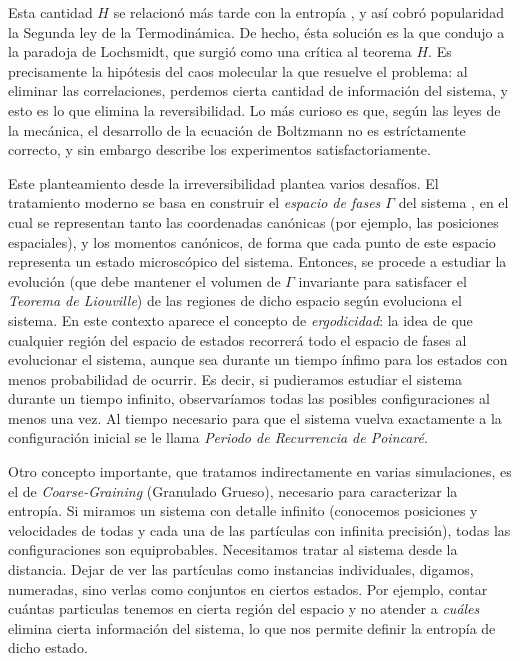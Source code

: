 \documentclass[11pt, a4paper]{article} %
\theoremstyle{named}
\begin{document}
Esta cantidad $H$ se relacionó más tarde con la entropía \cite{huang}, y así cobró popularidad la Segunda ley de la Termodinámica. De hecho, ésta solución es la que condujo a la paradoja de Lochsmidt, que surgió como una crítica al teorema $H$. Es precisamente la hipótesis del caos molecular la que resuelve el problema: al eliminar las correlaciones, perdemos cierta cantidad de información del sistema, y esto es lo que elimina la reversibilidad.
Lo más curioso es que, según las leyes de la mecánica, el desarrollo de la ecuación de Boltzmann no es estríctamente correcto, y sin embargo describe los experimentos satisfactoriamente.

Este planteamiento desde la irreversibilidad plantea varios desafíos. El tratamiento moderno se basa en construir el \textit{espacio de fases $\Gamma$} del sistema \cite{pathria}, en el cual se representan tanto las coordenadas canónicas (por ejemplo, las posiciones espaciales), y los momentos canónicos, de forma que cada punto de este espacio representa un estado microscópico del sistema. Entonces, se procede a estudiar la evolución (que debe mantener el volumen de $\Gamma$ invariante para satisfacer el \textit{Teorema de Liouville}) de las regiones de dicho espacio según evoluciona el sistema. En este contexto aparece el concepto de \textit{ergodicidad}: la idea de que cualquier región del espacio de estados recorrerá todo el espacio de fases al evolucionar el sistema, aunque sea durante un tiempo ínfimo para los estados con menos probabilidad de ocurrir. Es decir, si pudieramos estudiar el sistema durante un tiempo infinito, observaríamos todas las posibles configuraciones al menos una vez. Al tiempo necesario para que el sistema vuelva exactamente a la configuración inicial se le llama \textit{Periodo de Recurrencia de Poincaré}.

Otro concepto importante, que tratamos indirectamente en varias simulaciones, es el de \textit{Coarse-Graining} (Granulado Grueso), necesario para caracterizar la entropía. Si miramos un sistema con detalle infinito (conocemos posiciones y velocidades de todas y cada una de las partículas con infinita precisión), todas las configuraciones son equiprobables. Necesitamos tratar al sistema desde la distancia. Dejar de ver las partículas como instancias individuales, digamos, numeradas, sino verlas como conjuntos en ciertos estados. Por ejemplo, contar cuántas particulas tenemos en cierta región del espacio y no atender a \textit{cuáles} elimina cierta información del sistema, lo que nos permite definir la entropía de dicho estado.
\end{document}
